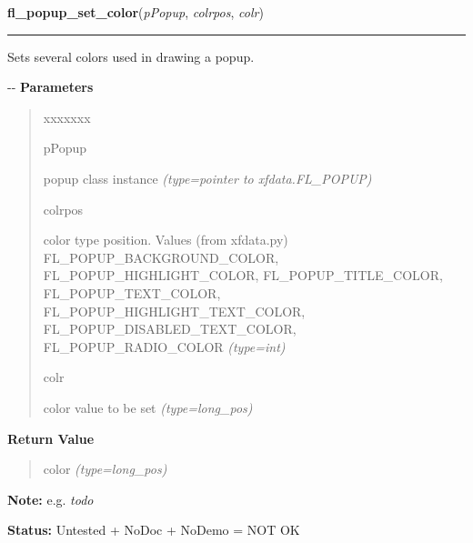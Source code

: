     \vspace{0.5ex}

\hspace{.8\funcindent}\begin{boxedminipage}{\funcwidth}

    \raggedright \textbf{fl\_popup\_set\_color}(\textit{pPopup}, \textit{colrpos}, \textit{colr})

    \vspace{-1.5ex}

    \rule{\textwidth}{0.5\fboxrule}
\setlength{\parskip}{2ex}

Sets several colors used in drawing a popup.

-{}-
\setlength{\parskip}{1ex}
      \textbf{Parameters}
      \vspace{-1ex}

      \begin{quote}
        \begin{Ventry}{xxxxxxx}

          \item[pPopup]


popup class instance
            {\it (type=pointer to xfdata.FL\_POPUP)}

          \item[colrpos]


color type position. Values (from xfdata.py) FL\_POPUP\_BACKGROUND\_COLOR,
FL\_POPUP\_HIGHLIGHT\_COLOR, FL\_POPUP\_TITLE\_COLOR, FL\_POPUP\_TEXT\_COLOR,
FL\_POPUP\_HIGHLIGHT\_TEXT\_COLOR, FL\_POPUP\_DISABLED\_TEXT\_COLOR,
FL\_POPUP\_RADIO\_COLOR
            {\it (type=int)}

          \item[colr]


color value to be set
            {\it (type=long\_pos)}

        \end{Ventry}

      \end{quote}

      \textbf{Return Value}
    \vspace{-1ex}

      \begin{quote}

color
      {\it (type=long\_pos)}

      \end{quote}

\textbf{Note:} 
e.g. \emph{todo}


\textbf{Status:} 
Untested + NoDoc + NoDemo = NOT OK


    \end{boxedminipage}

